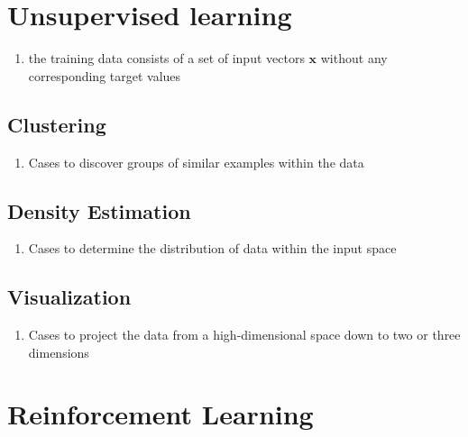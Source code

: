 \section{Unsupervised learning}

\begin{enumerate}
    \item the training data consists of a set of input vectors $\bm{x}$ without any corresponding target values
    \hfill \cite{ml/book/Pattern-Recognition-And-Machine-Learning/Christopher-M-Bishop}
\end{enumerate}

\subsection{Clustering}

\begin{enumerate}
    \item Cases to discover groups of similar examples within the data
    \hfill \cite{ml/book/Pattern-Recognition-And-Machine-Learning/Christopher-M-Bishop}
\end{enumerate}


\subsection{Density Estimation}

\begin{enumerate}
    \item Cases to determine the distribution of data within the input space
    \hfill \cite{ml/book/Pattern-Recognition-And-Machine-Learning/Christopher-M-Bishop}
\end{enumerate}


\subsection{Visualization}

\begin{enumerate}
    \item Cases to project the data from a high-dimensional space down to two or three dimensions
    \hfill \cite{ml/book/Pattern-Recognition-And-Machine-Learning/Christopher-M-Bishop}
\end{enumerate}


\section{Reinforcement Learning}

